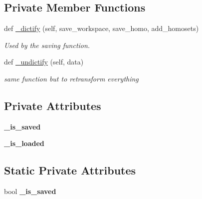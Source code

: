 \subsection*{Private Member Functions}
\begin{DoxyCompactItemize}
\item 
def \mbox{\hyperlink{class_py_c_u_b_1_1py_c_u_b_1_1_py_c_u_b_acf1d1899b90f65a22eef8bc93b1735ab}{\+\_\+dictify}} (self, save\+\_\+workspace, save\+\_\+homo, add\+\_\+homosets)
\begin{DoxyCompactList}\small\item\em Used by the saving function. \end{DoxyCompactList}\item 
def \mbox{\hyperlink{class_py_c_u_b_1_1py_c_u_b_1_1_py_c_u_b_a8f60d259562234b7872cdc9cef03ce75}{\+\_\+undictify}} (self, data)
\begin{DoxyCompactList}\small\item\em same function but to retransform everything \end{DoxyCompactList}\end{DoxyCompactItemize}
\subsection*{Private Attributes}
\begin{DoxyCompactItemize}
\item 
\mbox{\label{class_py_c_u_b_1_1py_c_u_b_1_1_py_c_u_b_aeb1012203f7072dafb43d297f76a438e}} 
{\bfseries \+\_\+is\+\_\+saved}
\item 
\mbox{\label{class_py_c_u_b_1_1py_c_u_b_1_1_py_c_u_b_a1cfa3e77ee07be4e8f1dd233fc97fea3}} 
{\bfseries \+\_\+is\+\_\+loaded}
\end{DoxyCompactItemize}
\subsection*{Static Private Attributes}
\begin{DoxyCompactItemize}
\item 
\mbox{\label{class_py_c_u_b_1_1py_c_u_b_1_1_py_c_u_b_aeb1012203f7072dafb43d297f76a438e}} 
bool {\bfseries \+\_\+is\+\_\+saved}
\end{DoxyCompactItemize}



